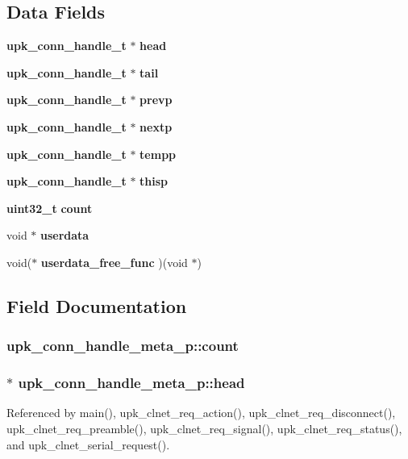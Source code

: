 \subsection*{Data Fields}
\begin{DoxyCompactItemize}
\item 
{\bf upk\_\-conn\_\-handle\_\-t} $\ast$ {\bf head}
\item 
{\bf upk\_\-conn\_\-handle\_\-t} $\ast$ {\bf tail}
\item 
{\bf upk\_\-conn\_\-handle\_\-t} $\ast$ {\bf prevp}
\item 
{\bf upk\_\-conn\_\-handle\_\-t} $\ast$ {\bf nextp}
\item 
{\bf upk\_\-conn\_\-handle\_\-t} $\ast$ {\bf tempp}
\item 
{\bf upk\_\-conn\_\-handle\_\-t} $\ast$ {\bf thisp}
\item 
{\bf uint32\_\-t} {\bf count}
\item 
void $\ast$ {\bf userdata}
\item 
void($\ast$ {\bf userdata\_\-free\_\-func} )(void $\ast$)
\end{DoxyCompactItemize}


\subsection{Field Documentation}
\subsubsection[{count}]{ {\bf upk\_\-conn\_\-handle\_\-meta\_\-p::count}}\label{structupk__conn__handle__meta__p_a405c825990c6a490f10713597a1ed1e0}
\subsubsection[{head}]{ $\ast$ {\bf upk\_\-conn\_\-handle\_\-meta\_\-p::head}}\label{structupk__conn__handle__meta__p_a86b21bcc968396141d096db171ec5d36}


Referenced by main(), upk\_\-clnet\_\-req\_\-action(), upk\_\-clnet\_\-req\_\-disconnect(), upk\_\-clnet\_\-req\_\-preamble(), upk\_\-clnet\_\-req\_\-signal(), upk\_\-clnet\_\-req\_\-status(), and upk\_\-clnet\_\-serial\_\-request().

